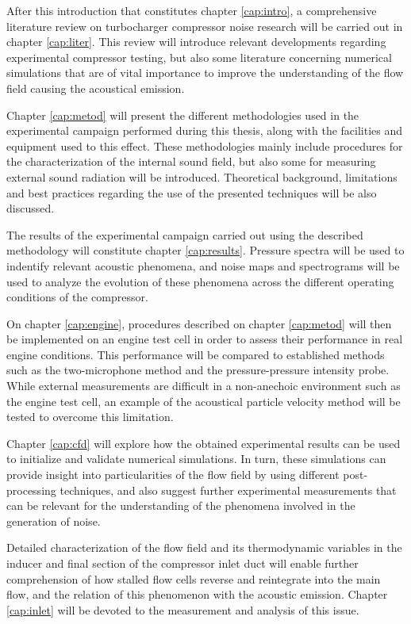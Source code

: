 After this introduction that constitutes chapter \ref{cap:intro}, a comprehensive literature review on turbocharger compressor noise research will be carried out in chapter \ref{cap:liter}. This review will introduce relevant developments regarding experimental compressor testing, but also some literature concerning numerical simulations that are of vital importance to improve the understanding of the flow field causing the acoustical emission.

Chapter \ref{cap:metod} will present the different methodologies used in the experimental campaign performed during this thesis, along with the facilities and equipment used to this effect. These methodologies mainly include procedures for the characterization of the internal sound field, but also some for measuring external sound radiation will be introduced. Theoretical background, limitations and best practices regarding the use of the presented techniques will be also discussed.

The results of the experimental campaign carried out using the described methodology will constitute chapter \ref{cap:results}. Pressure spectra will be used to indentify relevant acoustic phenomena, and noise maps and spectrograms will be used to analyze the evolution of these phenomena across the different operating conditions of the compressor.

On chapter \ref{cap:engine}, procedures described on chapter \ref{cap:metod} will then be implemented on an engine test cell in order to assess their performance in real engine conditions. This performance will be compared to established methods such as the two-microphone method and the pressure-pressure intensity probe. While external measurements are difficult in a non-anechoic environment such as the engine test cell, an example of the acoustical particle velocity method will be tested to overcome this limitation.

Chapter \ref{cap:cfd} will explore how the obtained experimental results can be used to initialize and validate numerical simulations. In turn, these simulations can provide insight into particularities of the flow field by using different post-processing techniques, and also suggest further experimental measurements that can be relevant for the understanding of the phenomena involved in the generation of noise.

Detailed characterization of the flow field and its thermodynamic variables in the inducer and final section of the compressor inlet duct will enable further comprehension of how stalled flow cells reverse and reintegrate into the main flow, and the relation of this phenomenon with the acoustic emission. Chapter \ref{cap:inlet} will be devoted to the measurement and analysis of this issue.

